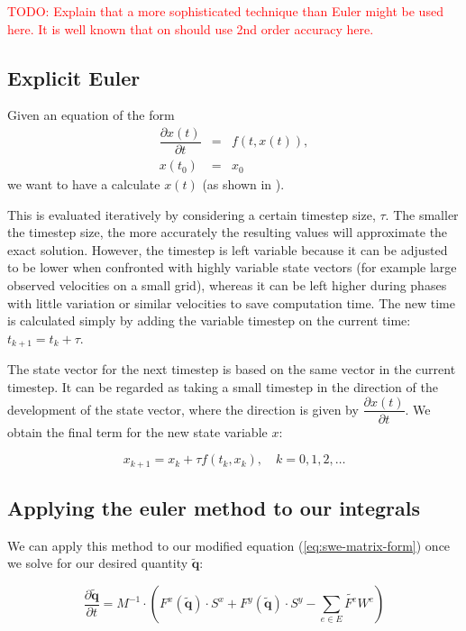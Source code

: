 \documentclass{article}
\newcommand{\todo}[1]{\textcolor{red}{TODO: #1}}
\newcommand{\pd}[2]{\dfrac{\partial #1}{\partial #2}}
\begin{document}
\todo{Explain that a more sophisticated technique than Euler might be used here. It is well known that on should use 2nd order accuracy here.}

\subsection{Explicit Euler}
\label{subsec:explicit-euler}

Given an equation of the form
\begin{eqnarray}
  \label{eq:euler-method-setting}
  \pd{x(t)}{t} & = & f(t, x(t)), \\
  x(t_0) & = & x_0
\end{eqnarray}
we want to have a calculate $x(t)$ (as shown in \cite{schwaiger08adaptive}).

This is evaluated iteratively by considering a certain timestep size, $\tau$. The smaller the timestep size, the more accurately the resulting values will approximate the exact solution. However, the timestep is left variable because it can be adjusted to be lower when confronted with highly variable state vectors (for example large observed velocities on a small grid), whereas it can be left higher during phases with little variation or similar velocities to save computation time. The new time is calculated simply by adding the variable timestep on the current time: $t_{k+1} = t_k + \tau$.

The state vector for the next timestep is based on the same vector in the current timestep. It can be regarded as taking a small timestep in the direction of the development of the state vector, where the direction is given by $\pd{x(t)}{t}$. We obtain the final term for the new state variable $x$:

\begin{equation}
  \label{eq:euler-step-solution}
  x_{k+1} = x_k + \tau f(t_k, x_k), \quad k=0,1,2,\dots
\end{equation}

\subsection{Applying the euler method to our integrals}
\label{subsec:euler-method-applied}

We can apply this method to our modified equation (\ref{eq:swe-matrix-form}) once we solve for our desired quantity $\tilde{\mathbf{q}}$:

\begin{equation*}
  \pd{\tilde{\mathbf{q}}}{t} =
  M^{-1} \cdot \left(
    F^x(\tilde{\mathbf{q}}) \cdot S^x +
    F^y(\tilde{\mathbf{q}}) \cdot S^y -
    \sum_{e \in E} \tilde{F^e} W^e\right
  )
\end{equation*}
\end{document}
